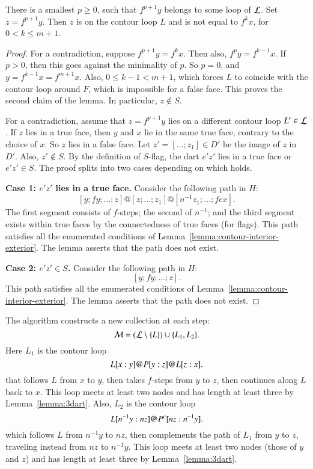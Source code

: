 \begin{lemma}  There is a smallest $p\ge0$, such that $f^{p+1} y$ belongs to some loop of ${\cal L}$.  Set $z=f^{p+1} y$.  Then   $z$ is on the contour loop $L$ and is not equal to $f^k x$, for $0 < k \le {m+1}$.
\end{lemma}

\begin{proof} 
For a contradiction, suppose $f^{p+1} y = f^k x$. Then also, $f^p y = f^{k-1} x$.  If $p>0$, then this goes against the minimality of $p$.  So $p=0$, and $y=f^{k-1} x = f^{m+1} x$.  Also, $0\le k-1 < {m+1}$, which forces $L$ to coincide with the contour loop around $F$, which is impossible for a false face.  This proves the second claim of the lemma.  In particular, $z\not\in S$.

For a contradiction, assume that $z = f^{p+1} y$ lies on a different contour loop $L'\in {\cal L}$.  If $z$ lies in a true face, then $y$ and $x$ lie in the same true face, contrary to the choice of $x$.  So $z$ lies in a false face.  Let $z' = [\ldots;z_1]\in D'$ be the image of $z$ in $D'$.  Also,  $z'\not\in S$.  By the definition of $S$-flag, the dart $e'z'$ lies in a true face or $e'z'\in S$.  The proof splits into two cases depending on which holds.

{\bf Case 1: $e'z'$ lies in a true face.}  Consider the following path in $H$:
$$
[y;fy;\ldots;z] @ [z;\ldots;z_1] @ [n^{-1} z_1;\ldots;f e x].
$$
The first segment consists of $f$-steps; the second of $n^{-1}$; and the third segment exists within true faces by the connectedness of true faces (for flags).  This
path satisfies all the enumerated conditions of Lemma~\ref{lemma:contour-interior-exterior}.  The lemma asserts that the path does not exist.

{\bf Case 2: $e'z'\in S$.}   Consider the following path in $H$:
$$
[y;f y;\ldots;z].
$$
 This
path satisfies all the enumerated conditions of Lemma~\ref{lemma:contour-interior-exterior}.  The lemma asserts that the path does not exist.
\end{proof}


The algorithm constructs a new collection at each step:
$${\cal M} = ({\cal L}\setminus \{L\}) \cup \{L_1,L_2\}.$$
Here $L_1$ is the contour loop
$$
L[x:y] {\operatorname{@}} P[y:z] {\operatorname{@}} L[z:x].
$$
that follows $L$ from $x$ to $y$, then takes $f$-steps from $y$ to $z$, then continues along $L$ back to $x$.  This loop meets at least two nodes and has length at least three by Lemma~\ref{lemma:3dart}. Also, $L_2$ is the contour loop
$$
L[n^{-1}y:n z] {\operatorname{@}} P^c[n z:n^{-1}y].
$$
which follows $L$ from $n^{-1} y$ to $n z$, then complements the path of $L_1$ from $y$ to $z$, traveling instead from $n z$ to $n^{-1} y$.  This loop meets at least two nodes (those of $y$ and $z$) and has length at least three by Lemma~\ref{lemma:3dart}.

